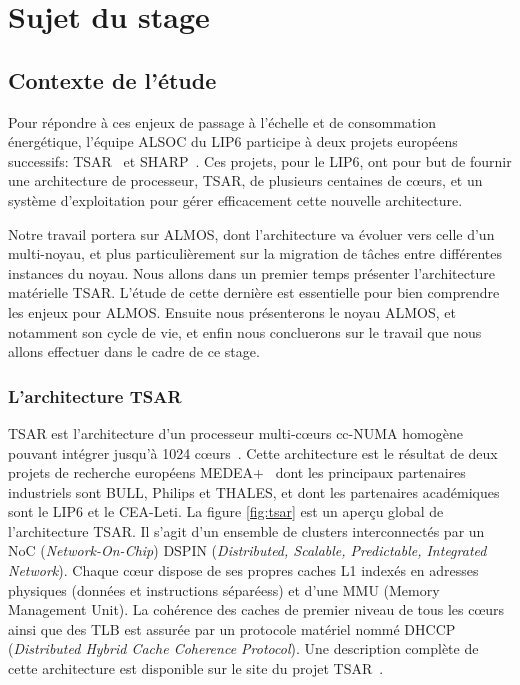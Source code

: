 \chapter{Sujet du stage}
\label{chap:subject}

  \section{Contexte de l'étude}

    Pour répondre à ces enjeux de passage à l'échelle et de consommation
    énergétique, l'équipe ALSOC du LIP6 participe à deux projets européens
    successifs: TSAR~\cite{tsar2008} et SHARP~\cite{sharp2012}. Ces projets,
    pour le LIP6, ont pour but de fournir une architecture de processeur, TSAR,
    de plusieurs centaines de c\oe urs, et un système d'exploitation pour gérer
    efficacement cette nouvelle architecture.

    Notre travail portera sur ALMOS, dont l'architecture va évoluer vers celle
    d'un multi-noyau, et plus particulièrement sur la migration de tâches entre
    différentes instances du noyau. Nous allons dans un premier temps présenter
    l'architecture matérielle TSAR. L'étude de cette dernière est essentielle
    pour bien comprendre les enjeux pour ALMOS. Ensuite nous présenterons le
    noyau ALMOS, et notamment son cycle de vie, et enfin nous concluerons sur le
    travail que nous allons effectuer dans le cadre de ce stage.
  

    \subsection{L'architecture TSAR}
    \label{sec:tsar}

      TSAR est l'architecture d’un processeur multi-c\oe urs cc-NUMA homogène
      pouvant intégrer jusqu’à 1024 c\oe urs~\cite{greiner2009tsar}. Cette
      architecture est le résultat de deux projets de recherche européens
      MEDEA+~\cite{tsar2008,sharp2012} dont les principaux partenaires
      industriels sont BULL, Philips et THALES, et dont les partenaires
      académiques sont le LIP6 et le CEA-Leti. La figure \ref{fig:tsar} est un
      aperçu global de l'architecture TSAR. Il s'agit d'un ensemble de clusters
      interconnectés par un NoC (\textit{Network-On-Chip}) DSPIN
      (\textit{Distributed, Scalable, Predictable, Integrated Network}). Chaque
      c\oe ur dispose de ses propres caches L1 indexés en adresses physiques
      (données et instructions séparéess) et d'une MMU (Memory Management
      Unit). La cohérence des caches de premier niveau de tous les c\oe urs
      ainsi que des TLB est assurée par un protocole matériel nommé DHCCP
      (\textit{Distributed Hybrid Cache Coherence Protocol}). Une description
      complète de cette architecture est disponible sur le site du projet
      TSAR~\cite{tsar2008web}.

